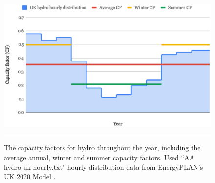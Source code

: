 \begin{figure}[htbp]
	\centering
	\includegraphics[width=\textwidth]{figures/Hydro_distribution.eps}
	\rule{\textwidth}{0.5pt} %
	\caption{The capacity factors for hydro throughout the year, including the average annual, winter and summer capacity factors. Used ``AA hydro uk hourly.txt" hourly distribution data from EnergyPLAN's UK 2020 Model \citep{EnergyPLAN_UK2020}.}
	\label{fig:hydro_distribution}
\end{figure}